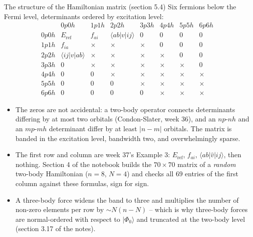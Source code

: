 \documentclass[aspectratio=169,10pt]{beamer}
\newcommand{\ket}[1]{\vert #1\rangle}
\newcommand{\element}[3]{\langle #1\vert #2\vert #3\rangle}
\begin{document}
\begin{frame}{The structure of the Hamiltonian matrix (section 5.4)}
  \footnotesize
  Six fermions below the Fermi level, determinants ordered by excitation level:
  \[
    \begin{array}{c|ccccccc}
       & 0p0h & 1p1h & 2p2h & 3p3h & 4p4h & 5p5h & 6p6h\\
      \hline
      0p0h & E_{\mathrm{ref}} & f_{ai} & \element{ab}{v}{ij} & 0 & 0 & 0 & 0\\
      1p1h & f_{ia} & \times & \times & \times & 0 & 0 & 0\\
      2p2h & \element{ij}{v}{ab} & \times & \times & \times & \times & 0 & 0\\
      3p3h & 0 & \times & \times & \times & \times & \times & 0\\
      4p4h & 0 & 0 & \times & \times & \times & \times & \times\\
      5p5h & 0 & 0 & 0 & \times & \times & \times & \times\\
      6p6h & 0 & 0 & 0 & 0 & \times & \times & \times
    \end{array}
  \]
  \begin{itemize}
    \item The zeros are not accidental: a two-body operator connects determinants differing by at most two orbitals (Condon-Slater, week 36), and an $np$-$nh$ and an $mp$-$mh$ determinant differ by at least $|n-m|$ orbitals. The matrix is \alert{banded in the excitation level, bandwidth two}, and overwhelmingly sparse.
    \item The first row and column are week 37's Example 3: $E_{\mathrm{ref}}$, $f_{ai}$, $\element{ab}{\hat{v}}{ij}$, then nothing. Section 4 of the notebook builds the $70\times70$ matrix of a \emph{random} two-body Hamiltonian ($n=8$, $N=4$) and checks all $69$ entries of the first column against these formulas, sign for sign.
    \item A three-body force widens the band to three and multiplies the number of non-zero elements per row by $\sim N(n-N)$ -- which is why three-body forces are normal-ordered with respect to $\ket{\Phi_0}$ and truncated at the two-body level (section 3.17 of the notes).
  \end{itemize}
\end{frame}
\end{document}
